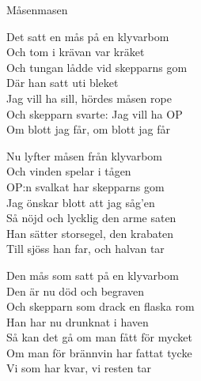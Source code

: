 \begin{song}{Måsen}{masen}
\begin{vers}
Det satt en mås på en klyvarbom\\
Och tom i krävan var kräket\\
Och tungan lådde vid skepparns gom\\
Där han satt uti bleket\\
Jag vill ha sill, hördes måsen rope\\
Och skepparn svarte: Jag vill ha OP\\
Om blott jag får, om blott jag får\\
\end{vers}

\begin{vers}
Nu lyfter måsen från klyvarbom\\
Och vinden spelar i tågen\\
OP:n svalkat har skepparns gom\\
Jag önskar blott att jag såg'en\\
Så nöjd och lycklig den arme saten\\
Han sätter storsegel, den krabaten\\
Till sjöss han far, och halvan tar\\
\end{vers}

\begin{vers}
Den mås som satt på en klyvarbom\\
Den är nu död och begraven\\
Och skepparn som drack en flaska rom\\
Han har nu drunknat i haven\\
Så kan det gå om man fått för mycket\\
Om man för brännvin har fattat tycke\\
Vi som har kvar, vi resten tar\\
\end{vers}
\end{song}
